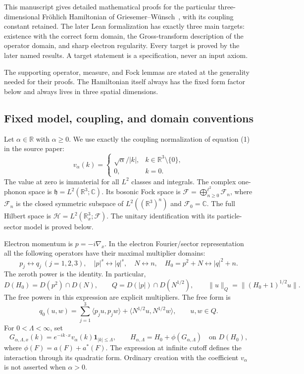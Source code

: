 \documentclass[11pt,a4paper]{article}
\theoremstyle{definition}
\theoremstyle{remark}
\begin{document}
This manuscript gives detailed mathematical proofs for the particular
three-dimensional Fr\"ohlich Hamiltonian of Griesemer--W\"unsch~\cite{GW16},
with its coupling constant retained. The later Lean formalization has
exactly three main targets: existence with the correct form domain, the
Gross-transform description of the operator domain, and sharp electron
regularity. Every target is proved by the later named results. A target
statement is a specification, never an input axiom.

The supporting operator, measure, and Fock lemmas are stated at the
generality needed for their proofs. The Hamiltonian itself always has
the fixed form factor below and always lives in three spatial dimensions.

\subsection{Fixed model, coupling, and domain conventions}
\label{target:common-data}

Let $\alpha\in\mathbb R$ with $\alpha\geq0$. We use exactly the coupling
normalization of equation (1) in the source paper:
\[
 v_\alpha(k)=\begin{cases}\sqrt\alpha/|k|,&k\in\mathbb R^3\setminus\{0\},\\
                          0,&k=0.
             \end{cases}
\]
The value at zero is immaterial for all $L^2$ classes and integrals.
The complex one-phonon space is $\mathfrak h=L^2(\mathbb R^3;\mathbb C)$.
Its bosonic Fock space is
$\mathcal F=\bigoplus_{n\geq0}^{\ell^2}\mathcal F_n$, where
$\mathcal F_n$ is the closed symmetric subspace of
$L^2((\mathbb R^3)^n)$ and $\mathcal F_0=\mathbb C$.
The full Hilbert space is
$\mathcal H=L^2(\mathbb R^3_x;\mathcal F)$.
The unitary identification with its particle-sector model is proved below.

Electron momentum is $p=-i\nabla_x$. In the electron Fourier/sector
representation all the following operators have their maximal multiplier
domains:
\[
 p_j\leftrightarrow q_j\ (j=1,2,3),\quad
 |p|^s\leftrightarrow |q|^s,\quad N\leftrightarrow n,\quad
 H_0=p^2+N\leftrightarrow |q|^2+n.
\]
The zeroth power is the identity. In particular,
\[
 D(H_0)=D(p^2)\cap D(N),\qquad
 Q=D(|p|)\cap D(N^{1/2}),\qquad
 \|u\|_Q=\|(H_0+1)^{1/2}u\|.
\]
The free powers in this expression are explicit multipliers. The free
form is
\[
 q_0(u,w)=\sum_{j=1}^3\langle p_ju,p_jw\rangle
                    +\langle N^{1/2}u,N^{1/2}w\rangle,\qquad u,w\in Q.
\]
For $0<\Lambda<\infty$, set
\[
 G_{\alpha,\Lambda,x}(k)=e^{-ik\cdot x}v_\alpha(k)\mathbf1_{|k|\leq\Lambda},
 \qquad H_{\alpha,\Lambda}=H_0+\phi(G_{\alpha,\Lambda})
                                      \quad\text{on }D(H_0),
\]
where $\phi(F)=a(F)+a^*(F)$. The expression at infinite cutoff defines
the interaction through its quadratic form. Ordinary creation with
the coefficient $v_\alpha$ is not asserted when $\alpha>0$.
\end{document}
